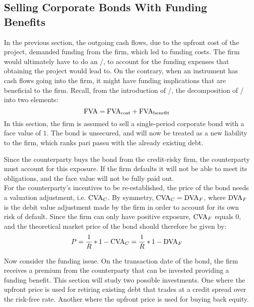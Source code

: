 \documentclass[main.tex]{subfiles}
\begin{document}
    \subsection{Selling Corporate Bonds With Funding Benefits}
    \label{sec:example-funding-benefit}
        In the previous section, 
        the outgoing cash flows, due to the upfront cost of the project,
        demanded funding from the firm, which led to funding costs. 
        The firm would ultimately have to do an \FVA/,
        to account for the funding expenses that obtaining the project would lead to.
        On the contrary, when an instrument has cash flows going into the firm,
        it might have funding implications that are beneficial to the firm.
        Recall, from the introduction of \FVA/, the decomposition of \FVA/ into two elements:
        \begin{equation*}
            \FVA/ = \FCA/ + \FBA/
        \end{equation*}
        In this section, the firm is assumed to sell a single-period corporate bond
        with a face value of $\num{1}$.
        The bond is unsecured, and will now be treated as a new liability to the firm, 
        which ranks pari passu with the already existing debt.

        Since the counterparty buys the bond from the credit-risky firm, 
        the counterparty must account for this exposure. 
        If the firm defaults it will not be able to meet its obligations, 
        and the face value will not be fully paid out. 
        \\
        For the counterparty's incentives to be re-established, 
        the price of the bond needs a valuation adjustment, i.e. $\CVA/_C$. 
        By symmetry, $\CVA/_C = \DVA/_F$, 
        where $\DVA/_F$ is the debit value adjustment made by the firm 
        in order to account for its own risk of default.
        Since the firm can only have positive exposure, $\CVA/_{F}$ equals $0$,
        and the theoretical market price of the bond should therefore be given by:
        \begin{equation}\label{eqn:option-value-credit-risk}
            P = \discountfactor*1 - \CVA/_C = \discountfactor*1 - \DVA/_F
        \end{equation}
        
        Now consider the funding issue. On the transaction date of the bond, 
        the firm receives a premium from the counterparty that can be invested 
        providing a funding benefit. 
        This section will study two possible investments.
        One where the upfront price is used for retiring existing debt 
        that trades at a credit spread over the risk-free rate. 
        Another where the upfront price is used for buying back equity. 
\end{document}
